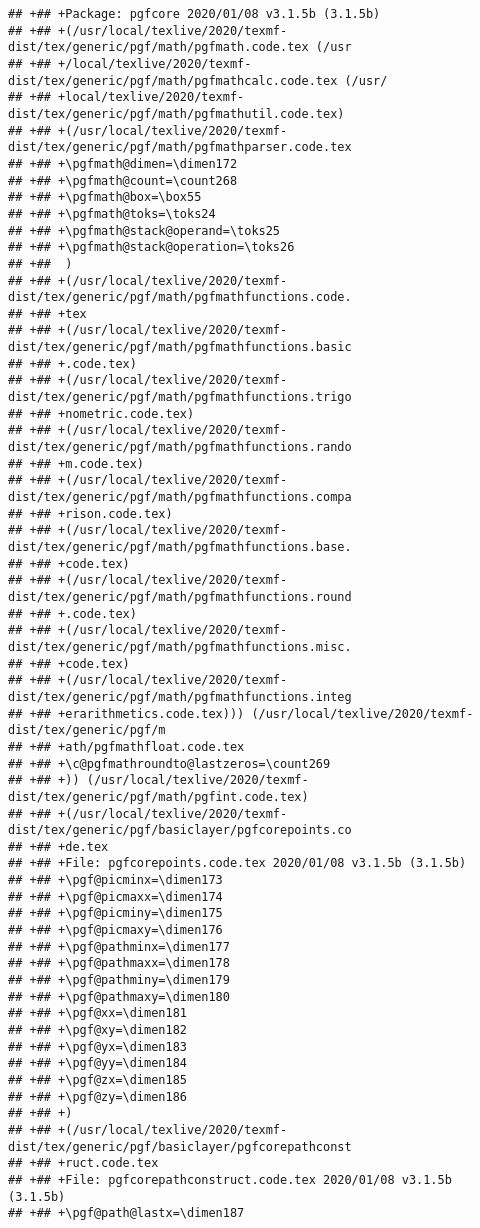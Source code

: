 \documentclass[ignorenonframetext,]{beamer}
\begin{document}
\begin{verbatim}
## +## +Package: pgfcore 2020/01/08 v3.1.5b (3.1.5b)
## +## +(/usr/local/texlive/2020/texmf-dist/tex/generic/pgf/math/pgfmath.code.tex (/usr
## +## +/local/texlive/2020/texmf-dist/tex/generic/pgf/math/pgfmathcalc.code.tex (/usr/
## +## +local/texlive/2020/texmf-dist/tex/generic/pgf/math/pgfmathutil.code.tex)
## +## +(/usr/local/texlive/2020/texmf-dist/tex/generic/pgf/math/pgfmathparser.code.tex
## +## +\pgfmath@dimen=\dimen172
## +## +\pgfmath@count=\count268
## +## +\pgfmath@box=\box55
## +## +\pgfmath@toks=\toks24
## +## +\pgfmath@stack@operand=\toks25
## +## +\pgfmath@stack@operation=\toks26
## +##  )
## +## +(/usr/local/texlive/2020/texmf-dist/tex/generic/pgf/math/pgfmathfunctions.code.
## +## +tex
## +## +(/usr/local/texlive/2020/texmf-dist/tex/generic/pgf/math/pgfmathfunctions.basic
## +## +.code.tex)
## +## +(/usr/local/texlive/2020/texmf-dist/tex/generic/pgf/math/pgfmathfunctions.trigo
## +## +nometric.code.tex)
## +## +(/usr/local/texlive/2020/texmf-dist/tex/generic/pgf/math/pgfmathfunctions.rando
## +## +m.code.tex)
## +## +(/usr/local/texlive/2020/texmf-dist/tex/generic/pgf/math/pgfmathfunctions.compa
## +## +rison.code.tex)
## +## +(/usr/local/texlive/2020/texmf-dist/tex/generic/pgf/math/pgfmathfunctions.base.
## +## +code.tex)
## +## +(/usr/local/texlive/2020/texmf-dist/tex/generic/pgf/math/pgfmathfunctions.round
## +## +.code.tex)
## +## +(/usr/local/texlive/2020/texmf-dist/tex/generic/pgf/math/pgfmathfunctions.misc.
## +## +code.tex)
## +## +(/usr/local/texlive/2020/texmf-dist/tex/generic/pgf/math/pgfmathfunctions.integ
## +## +erarithmetics.code.tex))) (/usr/local/texlive/2020/texmf-dist/tex/generic/pgf/m
## +## +ath/pgfmathfloat.code.tex
## +## +\c@pgfmathroundto@lastzeros=\count269
## +## +)) (/usr/local/texlive/2020/texmf-dist/tex/generic/pgf/math/pgfint.code.tex)
## +## +(/usr/local/texlive/2020/texmf-dist/tex/generic/pgf/basiclayer/pgfcorepoints.co
## +## +de.tex
## +## +File: pgfcorepoints.code.tex 2020/01/08 v3.1.5b (3.1.5b)
## +## +\pgf@picminx=\dimen173
## +## +\pgf@picmaxx=\dimen174
## +## +\pgf@picminy=\dimen175
## +## +\pgf@picmaxy=\dimen176
## +## +\pgf@pathminx=\dimen177
## +## +\pgf@pathmaxx=\dimen178
## +## +\pgf@pathminy=\dimen179
## +## +\pgf@pathmaxy=\dimen180
## +## +\pgf@xx=\dimen181
## +## +\pgf@xy=\dimen182
## +## +\pgf@yx=\dimen183
## +## +\pgf@yy=\dimen184
## +## +\pgf@zx=\dimen185
## +## +\pgf@zy=\dimen186
## +## +)
## +## +(/usr/local/texlive/2020/texmf-dist/tex/generic/pgf/basiclayer/pgfcorepathconst
## +## +ruct.code.tex
## +## +File: pgfcorepathconstruct.code.tex 2020/01/08 v3.1.5b (3.1.5b)
## +## +\pgf@path@lastx=\dimen187

\end{verbatim}
\end{document}
